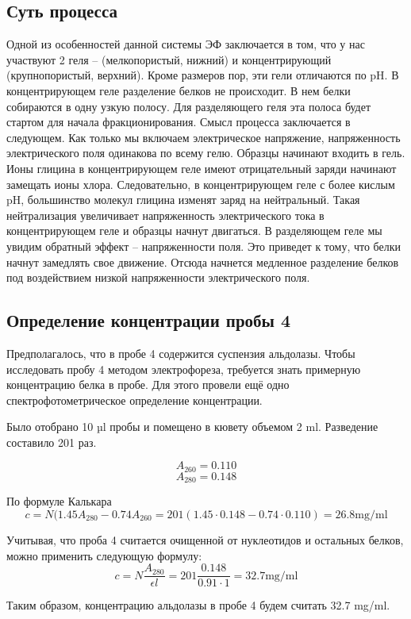 \subsection{Суть процесса}

Одной из особенностей данной системы ЭФ заключается в том, что у нас участвуют 2 геля --
(мелкопористый, нижний) и концентрирующий (крупнопористый, верхний). Кроме размеров
пор, эти гели отличаются по pH. В концентрирующем геле разделение белков не происходит. В нем белки
собираются в одну узкую полосу. Для разделяющего геля эта полоса будет стартом для начала
фракционирования. Смысл процесса заключается в следующем. Как только мы включаем электрическое
напряжение, напряженность электрического поля одинакова по всему гелю. Образцы начинают входить
в гель. Ионы глицина в концентрирующем геле имеют отрицательный заряди начинают замещать ионы
хлора. Следовательно, в концентрирующем геле  с более кислым pH, большинство молекул глицина
изменят заряд на нейтральный. Такая нейтрализация увеличивает напряженность электрического
тока в концентрирующем геле и образцы начнут двигаться. В разделяющем геле мы увидим обратный
эффект -- напряженности поля. Это приведет к тому, что белки начнут замедлять свое
движение. Отсюда начнется медленное разделение белков под воздействием низкой напряженности
электрического поля.

\subsection{Определение концентрации пробы 4}
Предполагалось, что в пробе 4 содержится суспензия альдолазы.
Чтобы исследовать пробу 4 методом электрофореза,
требуется знать примерную концентрацию белка в пробе.
Для этого провели ещё одно спектрофотометрическое определение концентрации.

Было отобрано 10 µl пробы и помещено в кювету объемом 2 ml.
Разведение составило 201 раз.

$$ A_{260} = 0.110 $$
$$ A_{280} = 0.148 $$

По формуле Калькара
$$ c = N (1.45 A_{280} - 0.74 A_{260} = 201 (1.45 \cdot 0.148 - 0.74 \cdot 0.110) = 26.8 \text{mg/ml}$$

Учитывая, что проба 4 считается очищенной от нуклеотидов и остальных белков,
можно применить следующую формулу:
$$ c = N \frac{A_{280}}{\epsilon l} = 201 \frac{0.148}{0.91 \cdot 1} = 32.7 \text{mg/ml}$$

Таким образом, концентрацию альдолазы в пробе 4 будем считать 32.7 mg/ml.

